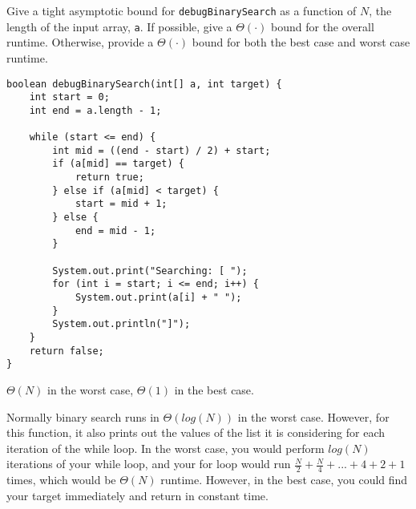 \begin{blocksection}
\question Give a tight asymptotic bound for \lstinline$debugBinarySearch$ as a
function of $N$, the length of the input array, \lstinline$a$. If possible,
give a $\Theta(\cdot)$ bound for the overall runtime. Otherwise, provide a
$\Theta(\cdot)$ bound for both the best case and worst case runtime.

\begin{lstlisting}
boolean debugBinarySearch(int[] a, int target) {
    int start = 0;
    int end = a.length - 1;

    while (start <= end) {
        int mid = ((end - start) / 2) + start;
        if (a[mid] == target) {
            return true;
        } else if (a[mid] < target) {
            start = mid + 1;
        } else {
            end = mid - 1;
        }

        System.out.print("Searching: [ ");
        for (int i = start; i <= end; i++) {
            System.out.print(a[i] + " ");
        }
        System.out.println("]");
    }
    return false;
}
\end{lstlisting}

\begin{solution}[0.5in]
$\Theta(N)$ in the worst case, $\Theta(1)$ in the best case.

Normally binary search runs in $\Theta(log(N))$ in the worst case. However, for this function, it also prints out the values of the list it is considering for each iteration of the while loop. In the worst case, you would perform $log(N)$ iterations of your while loop, and your for loop would run $\frac{N}{2} + \frac{N}{4} + ... + 4 + 2 + 1$ times, which would be $\Theta(N)$ runtime. However, in the best case, you could find your target immediately and return in constant time.
\end{solution}
\end{blocksection}
